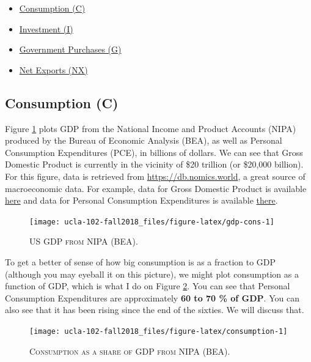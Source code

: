 \documentclass[]{book}
\providecommand{\tightlist}{%
  \setlength{\itemsep}{0pt}\setlength{\parskip}{0pt}}
\theoremstyle{definition}
\theoremstyle{definition}
\theoremstyle{definition}
\theoremstyle{remark}
\begin{document}
\begin{itemize}
\tightlist
\item
  \protect\hyperlink{cons}{Consumption (C)}
\item
  \protect\hyperlink{inv}{Investment (I)}
\item
  \protect\hyperlink{gov}{Government Purchases (G)}
\item
  \protect\hyperlink{net-exports}{Net Exports (NX)}
\end{itemize}

\hypertarget{cons}{\subsection{Consumption (C)}\label{cons}}

Figure \ref{fig:gdp-cons} plots GDP from the National Income and Product
Accounts (NIPA) produced by the Bureau of Economic Analysis (BEA), as
well as Personal Consumption Expenditures (PCE), in billions of dollars.
We can see that Gross Domestic Product is currently in the vicinity of
\$20 trillion (or \$20,000 billion). For this figure, data is retrieved
from \url{https://db.nomics.world}, a great source of macroeconomic
data. For example, data for Gross Domestic Product is available
\href{https://db.nomics.world/BEA/NIPA-T10105/A191RC-Q}{here} and data
for Personal Consumption Expenditures is available
\href{https://db.nomics.world/BEA/NIPA-T10105/DPCERC-Q}{there}.



\begin{figure}

{\centering \texttt{[image: ucla-102-fall2018\_files/figure-latex/gdp-cons-1]} 

}

\caption{\textsc{US GDP from NIPA (BEA)}.}\label{fig:gdp-cons}
\end{figure}

To get a better of sense of how big consumption is as a fraction to GDP
(although you may eyeball it on this picture), we might plot consumption
as a function of GDP, which is what I do on Figure
\ref{fig:consumption}. You can see that Personal Consumption
Expenditures are approximately \textbf{60 to 70 \% of GDP}. You can also
see that it has been rising since the end of the sixties. We will
discuss that.




\begin{figure}

{\centering \texttt{[image: ucla-102-fall2018\_files/figure-latex/consumption-1]} 

}

\caption{\textsc{Consumption as a share of GDP from NIPA
(BEA)}.}\label{fig:consumption}
\end{figure}
\end{document}
